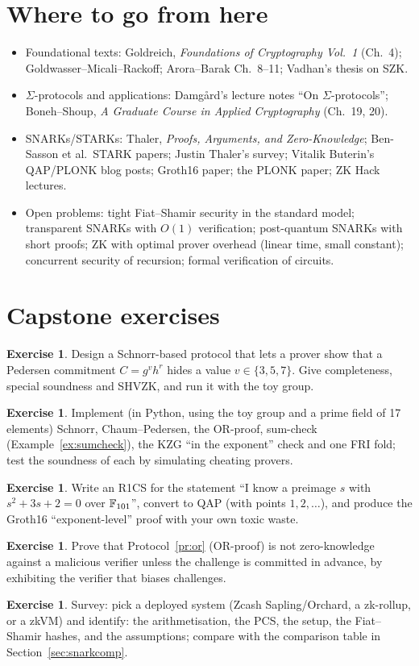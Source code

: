 \documentclass[11pt,a4paper]{report}
\theoremstyle{plain}
\theoremstyle{definition}
\newtheorem{exercise}[theorem]{Exercise}
\theoremstyle{remark}
\begin{document}
\section{Where to go from here}
\begin{itemize}
\item Foundational texts: Goldreich, \emph{Foundations of Cryptography Vol.\ 1} (Ch.\ 4); Goldwasser--Micali--Rackoff; Arora--Barak Ch.\ 8--11; Vadhan's thesis on SZK.
\item $\Sigma$-protocols and applications: Damgård's lecture notes ``On $\Sigma$-protocols''; Boneh--Shoup, \emph{A Graduate Course in Applied Cryptography} (Ch.\ 19, 20).
\item SNARKs/STARKs: Thaler, \emph{Proofs, Arguments, and Zero-Knowledge}; Ben-Sasson et al.\ STARK papers; Justin Thaler's survey; Vitalik Buterin's QAP/PLONK blog posts; Groth16 paper; the PLONK paper; ZK Hack lectures.
\item Open problems: tight Fiat--Shamir security in the standard model; transparent SNARKs with $O(1)$ verification; post-quantum SNARKs with short proofs; ZK with optimal prover overhead (linear time, small constant); concurrent security of recursion; formal verification of circuits.
\end{itemize}

\section*{Capstone exercises}
\begin{exercise}
Design a Schnorr-based protocol that lets a prover show that a Pedersen commitment $C=g^vh^r$ hides a value $v\in\{3,5,7\}$. Give completeness, special soundness and SHVZK, and run it with the toy group.
\end{exercise}
\begin{exercise}
Implement (in Python, using the toy group and a prime field of 17 elements) Schnorr, Chaum--Pedersen, the OR-proof, sum-check (Example~\ref{ex:sumcheck}), the KZG ``in the exponent'' check and one FRI fold; test the soundness of each by simulating cheating provers.
\end{exercise}
\begin{exercise}
Write an R1CS for the statement ``I know a preimage $s$ with $s^2+3s+2=0$ over $\mathbb{F}_{101}$'', convert to QAP (with points $1,2,\ldots$), and produce the Groth16 ``exponent-level'' proof with your own toxic waste.
\end{exercise}
\begin{exercise}
Prove that Protocol~\ref{pr:or} (OR-proof) is not zero-knowledge against a malicious verifier unless the challenge is committed in advance, by exhibiting the verifier that biases challenges.
\end{exercise}
\begin{exercise}
Survey: pick a deployed system (Zcash Sapling/Orchard, a zk-rollup, or a zkVM) and identify: the arithmetisation, the PCS, the setup, the Fiat--Shamir hashes, and the assumptions; compare with the comparison table in Section~\ref{sec:snarkcomp}.
\end{exercise}
\end{document}
